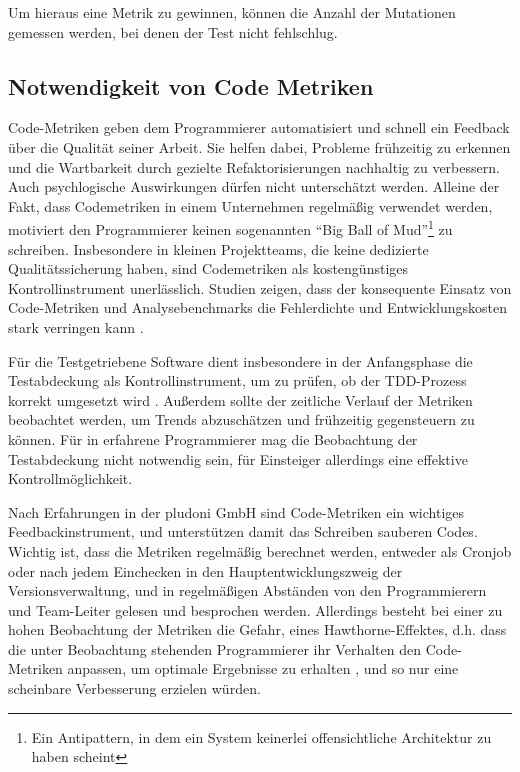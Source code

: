  Um hieraus eine Metrik zu gewinnen, können die Anzahl der Mutationen gemessen werden, bei denen der Test nicht fehlschlug.
 \subsection{Notwendigkeit von Code Metriken}

 Code-Metriken geben dem Programmierer automatisiert und schnell ein Feedback über die Qualität seiner Arbeit. Sie helfen dabei, Probleme frühzeitig zu erkennen und die Wartbarkeit durch gezielte Refaktorisierungen nachhaltig zu verbessern. Auch psychlogische Auswirkungen dürfen nicht unterschätzt werden. Alleine der Fakt, dass Codemetriken in einem Unternehmen regelmäßig verwendet werden, motiviert den Programmierer keinen sogenannten "`Big Ball of Mud"'\footnote{Ein Antipattern, in dem ein System keinerlei offensichtliche Architektur zu haben scheint} zu schreiben. Insbesondere in kleinen Projektteams, die keine dedizierte Qualitätssicherung haben, sind Codemetriken als kostengünstiges Kontrollinstrument unerlässlich. Studien zeigen, dass der konsequente Einsatz von Code-Metriken und Analysebenchmarks die Fehlerdichte und Entwicklungskosten stark verringen kann \citep[S.10f]{baggen_standardized_2011}.

 Für die Testgetriebene Software dient insbesondere in der Anfangsphase die Testabdeckung als Kontrollinstrument, um zu prüfen, ob der TDD-Prozess korrekt umgesetzt wird \citep[S. 300]{nagappan_realizing_2008}. Außerdem sollte der zeitliche Verlauf der Metriken beobachtet werden, um Trends abzuschätzen und frühzeitig gegensteuern zu können. Für in  erfahrene Programmierer mag die Beobachtung der Testabdeckung nicht notwendig sein, für Einsteiger allerdings eine effektive Kontrollmöglichkeit.

 Nach Erfahrungen in der pludoni GmbH sind Code-Metriken ein wichtiges Feedbackinstrument, und unterstützen damit das Schreiben sauberen Codes. Wichtig ist, dass die Metriken regelmäßig berechnet werden, entweder als Cronjob oder nach jedem Einchecken in den Hauptentwicklungszweig der Versionsverwaltung, und in regelmäßigen Abständen von den Programmierern und Team-Leiter gelesen und besprochen werden. Allerdings besteht bei einer zu hohen Beobachtung der Metriken die Gefahr, eines Hawthorne-Effektes, d.h. dass die unter Beobachtung stehenden Programmierer ihr Verhalten den Code-Metriken anpassen, um optimale Ergebnisse zu erhalten \citep[52. Karte]{langr_agile_2011}, und so nur eine scheinbare Verbesserung erzielen würden.
